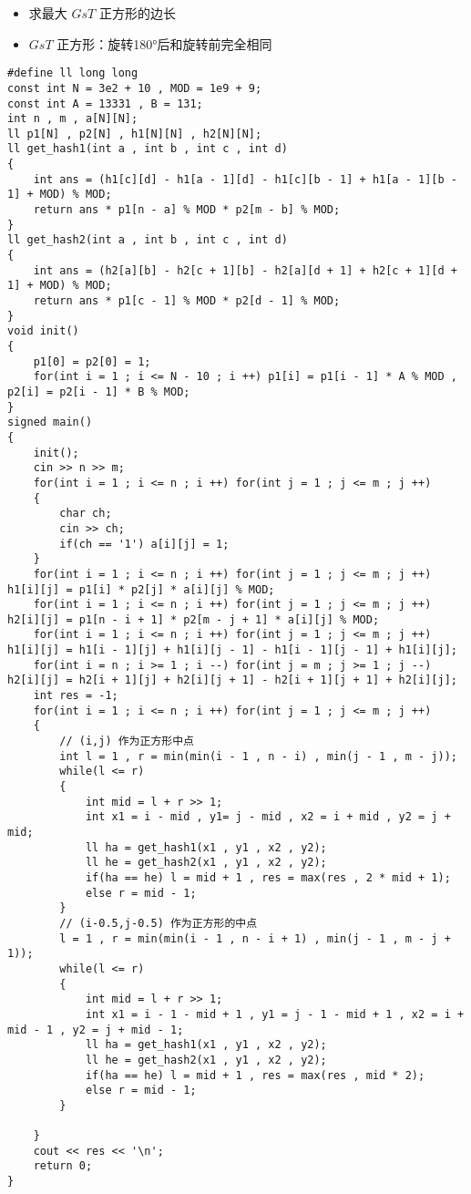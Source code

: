 \documentclass[E:/GsjzTle/main/main.tex]{subfiles}
\begin{document}
\begin{itemize}
\item
  求最大 \(GsT\) 正方形的边长
\item
  \(GsT\) 正方形：旋转180°后和旋转前完全相同
\end{itemize}

\begin{lstlisting}
#define ll long long
const int N = 3e2 + 10 , MOD = 1e9 + 9;
const int A = 13331 , B = 131;
int n , m , a[N][N];
ll p1[N] , p2[N] , h1[N][N] , h2[N][N];
ll get_hash1(int a , int b , int c , int d)
{
	int ans = (h1[c][d] - h1[a - 1][d] - h1[c][b - 1] + h1[a - 1][b - 1] + MOD) % MOD;
	return ans * p1[n - a] % MOD * p2[m - b] % MOD;
}
ll get_hash2(int a , int b , int c , int d)
{
	int ans = (h2[a][b] - h2[c + 1][b] - h2[a][d + 1] + h2[c + 1][d + 1] + MOD) % MOD;
	return ans * p1[c - 1] % MOD * p2[d - 1] % MOD;
}
void init()
{
	p1[0] = p2[0] = 1;
	for(int i = 1 ; i <= N - 10 ; i ++) p1[i] = p1[i - 1] * A % MOD , p2[i] = p2[i - 1] * B % MOD;	
}
signed main()
{
	init(); 
	cin >> n >> m;
	for(int i = 1 ; i <= n ; i ++) for(int j = 1 ; j <= m ; j ++)
	{
		char ch;
		cin >> ch;
		if(ch == '1') a[i][j] = 1;
	}
	for(int i = 1 ; i <= n ; i ++) for(int j = 1 ; j <= m ; j ++) h1[i][j] = p1[i] * p2[j] * a[i][j] % MOD;
	for(int i = 1 ; i <= n ; i ++) for(int j = 1 ; j <= m ; j ++) h2[i][j] = p1[n - i + 1] * p2[m - j + 1] * a[i][j] % MOD;
	for(int i = 1 ; i <= n ; i ++) for(int j = 1 ; j <= m ; j ++) h1[i][j] = h1[i - 1][j] + h1[i][j - 1] - h1[i - 1][j - 1] + h1[i][j];
	for(int i = n ; i >= 1 ; i --) for(int j = m ; j >= 1 ; j --) h2[i][j] = h2[i + 1][j] + h2[i][j + 1] - h2[i + 1][j + 1] + h2[i][j];
	int res = -1;
	for(int i = 1 ; i <= n ; i ++) for(int j = 1 ; j <= m ; j ++)
	{ 
		// (i,j) 作为正方形中点 
		int l = 1 , r = min(min(i - 1 , n - i) , min(j - 1 , m - j));
		while(l <= r)
		{
			int mid = l + r >> 1;
			int x1 = i - mid , y1= j - mid , x2 = i + mid , y2 = j + mid; 
			ll ha = get_hash1(x1 , y1 , x2 , y2);
			ll he = get_hash2(x1 , y1 , x2 , y2);
			if(ha == he) l = mid + 1 , res = max(res , 2 * mid + 1);
			else r = mid - 1;
		}
		// (i-0.5,j-0.5) 作为正方形的中点 
		l = 1 , r = min(min(i - 1 , n - i + 1) , min(j - 1 , m - j + 1));
		while(l <= r)
		{
			int mid = l + r >> 1;
			int x1 = i - 1 - mid + 1 , y1 = j - 1 - mid + 1 , x2 = i + mid - 1 , y2 = j + mid - 1;
			ll ha = get_hash1(x1 , y1 , x2 , y2);
			ll he = get_hash2(x1 , y1 , x2 , y2);
			if(ha == he) l = mid + 1 , res = max(res , mid * 2);
			else r = mid - 1;
		}
		
	}
	cout << res << '\n';
	return 0;
}
\end{lstlisting}
\end{document}
